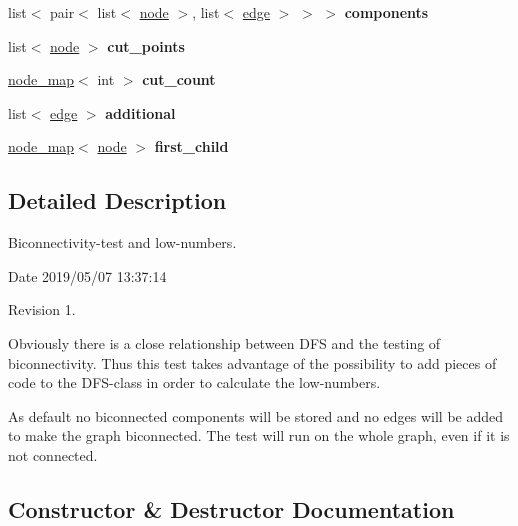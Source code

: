 \begin{DoxyCompactItemize}
list$<$ pair$<$ list$<$ \mbox{\hyperlink{classnode}{node}} $>$, list$<$ \mbox{\hyperlink{classedge}{edge}} $>$ $>$ $>$ {\bfseries components}
\item 
\mbox{\label{classbiconnectivity_a1591f1872a681e0dce0066ea00763c67}} 
list$<$ \mbox{\hyperlink{classnode}{node}} $>$ {\bfseries cut\+\_\+points}
\item 
\mbox{\label{classbiconnectivity_a67756de28954d13df615d8f2a93b22da}} 
\mbox{\hyperlink{classnode__map}{node\+\_\+map}}$<$ int $>$ {\bfseries cut\+\_\+count}
\item 
\mbox{\label{classbiconnectivity_a14148f2d705d6ed29f1b2370104a41b1}} 
list$<$ \mbox{\hyperlink{classedge}{edge}} $>$ {\bfseries additional}
\item 
\mbox{\label{classbiconnectivity_a3292c5b6bf3b91947509a380cf779706}} 
\mbox{\hyperlink{classnode__map}{node\+\_\+map}}$<$ \mbox{\hyperlink{classnode}{node}} $>$ {\bfseries first\+\_\+child}
\end{DoxyCompactItemize}


\subsection{Detailed Description}
Biconnectivity-\/test and low-\/numbers. 

\begin{DoxyParagraph}{Date}
2019/05/07 13\+:37\+:14 
\end{DoxyParagraph}
\begin{DoxyParagraph}{Revision}
1. 
\end{DoxyParagraph}


Obviously there is a close relationship between D\+FS and the testing of biconnectivity. Thus this test takes advantage of the possibility to add pieces of code to the D\+F\+S-\/class in order to calculate the low-\/numbers.

As default no biconnected components will be stored and no edges will be added to make the graph biconnected. The test will run on the whole graph, even if it is not connected. 

\subsection{Constructor \& Destructor Documentation}
\mbox{\label{classbiconnectivity_aec8c11afda486322b872f468cabd1f56}} 
